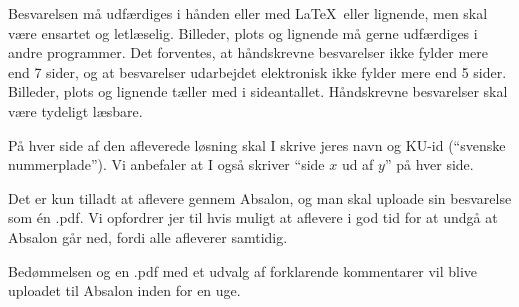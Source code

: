 \documentclass{article}
\begin{document}
	\bigskip  
	\noindent
	Besvarelsen må udfærdiges i hånden eller med \LaTeX\ eller lignende, men skal være ensartet og letlæselig. Billeder, plots og lignende må gerne udfærdiges i andre programmer. Det forventes, at håndskrevne besvarelser ikke fylder mere end 7 sider,
	og at besvarelser udarbejdet elektronisk ikke fylder mere end 5 sider. Billeder, plots og lignende tæller med i sideantallet. Håndskrevne besvarelser skal være tydeligt læsbare.
	
	\bigskip 
	\noindent
	P\aa{} hver side af den afleverede l\o{}sning skal I skrive jeres navn og KU-id (``svenske nummerplade''). Vi anbefaler at I ogs\aa{} skriver ``side $x$ ud af $y$'' p\aa{} hver side.
	
	\bigskip 
	\noindent
	Det er kun tilladt at aflevere gennem Absalon, og man skal uploade sin besvarelse som én .pdf. Vi opfordrer jer til hvis muligt at aflevere i god tid for at undgå at Absalon går ned, fordi alle afleverer samtidig.
	
	\bigskip
	\noindent
	Bedømmelsen og en .pdf med et udvalg af forklarende kommentarer vil blive uploadet til Absalon inden for en uge.
\end{document}
